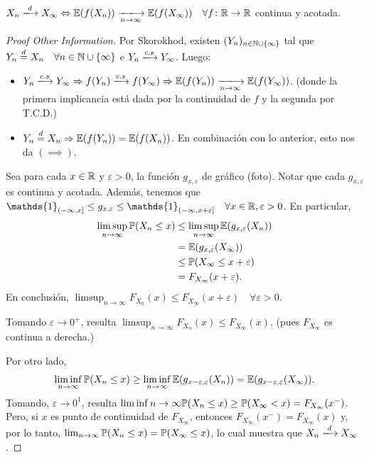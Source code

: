 
\begin{corollary}
	$X_{n} \xlongrightarrow{d} X_{\infty} \iff \mbb{E}(f(X_{n})) \xlongrightarrow[n \to \infty]{} \mbb{E}(f(X_{\infty})) \quad \forall f \colon \R \to \R$ continua y acotada.
\end{corollary}
\begin{proof}[Proof Other Information]
	\boxed{\implies} Por Skorokhod, existen $(Y_{n})_{n \in \mathbb{N} \cup \{\infty\}}$ tal que $Y_{n} \stackrel{d}{=} X_{n} \quad \forall n \in \mathbb{N} \cup \{\infty\}$ e $Y_{n} \xlongrightarrow{c.s} Y_{\infty}$. Luego:
	\begin{itemize}
		\item $Y_{n} \xlongrightarrow{c.s} Y_{\infty} \implies f(Y_{n}) \xlongrightarrow{c.s} f(Y_{\infty}) \implies \mbb{E}(f(Y_{n})) \xlongrightarrow[n \to \infty]{} \mbb{E}(f(Y_{\infty}))$. (donde la primera implicancia está dada por la continuidad de $f$ y la segunda por T.C.D.)

		\item $Y_{n} \stackrel{d}{=} X_{n} \Rightarrow \mathbb{E}(f(Y_{n})) = \mathbb{E}(f(X_{n}))$. En combinación con lo anterior, esto nos da $(\implies)$.
	\end{itemize}
	\medskip \par
	\boxed{\impliedby} Sea para cada $x \in \mathbb{R}$ y $\varepsilon > 0$, la función $g_{x, \varepsilon}$ de gráfico (foto). Notar que cada $g_{x, \varepsilon}$ es continua y acotada. Además, tenemos que $\mathds{1}_{(-\infty,x]} \leq g_{x,\varepsilon} \leq \mathds{1}_{(-\infty,x + \varepsilon]} \quad \forall x \in \R, \varepsilon > 0$. En particular,
	\begin{align*}
		\limsup_{n \to \infty} \mathbb{P}(X_{n} \leq x) &\leq \limsup_{n \to \infty} \mathbb{E}(g_{x,\varepsilon} (X_{n})) \\
		&= \mathbb{E}(g_{x, \varepsilon} (X_{\infty})) \\
		&\leq \mathbb{P}(X_{\infty} \leq x + \varepsilon) \\
		&= F_{X_{\infty}}(x + \varepsilon)
	.\end{align*}
	En conclusión, $\limsup_{n \to \infty} F_{X_{n}}(x) \leq F_{X_{\infty}}(x + \varepsilon) \quad \forall \varepsilon > 0$. \par
	Tomando $\varepsilon \longrightarrow 0^{+}$, resulta $\limsup_{n \to \infty} F_{X_{n}}(x) \leq F_{X_{\infty}}(x)$. (pues $F_{X_{\infty}}$ es continua a derecha.) \par
	Por otro lado,
	\[ \liminf_{n \to \infty} \mathbb{P}(X_{n} \leq x) \geq \liminf_{n \to \infty} \mathbb{E}(g_{x - \varepsilon, \varepsilon} (X_{n})) = \mathbb{E}(g_{x - \varepsilon, \varepsilon} (X_{\infty})). \]
	Tomando, $\varepsilon \longrightarrow 0^{1}$, resulta $\liminf{n \to \infty} \mathbb{P}(X_{n} \leq x) \geq \mathbb{P}(X_{\infty} < x) = F_{X_{\infty}}(x^{-})$. Pero, si $x$ es punto de continuidad de $F_{X_{\infty}}$, entonces $F_{X_{\infty}}(x^{-}) = F_{X_{\infty}}(x)$ y, por lo tanto, $\lim_{n \to \infty} \mathbb{P}(X_{n} \leq x) = \mathbb{P}(X_{\infty} \leq x)$, lo cual muestra que $X_{n} \xlongrightarrow{d} X_{\infty}$.
\end{proof}

